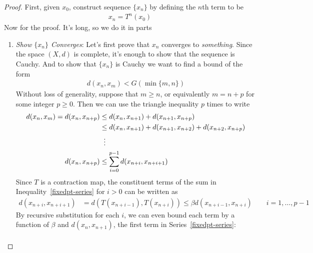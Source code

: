 \documentclass[12pt]{book}
\numberwithin{equation}{section} %
\theoremstyle{plain}
\theoremstyle{definition}
\theoremstyle{remark}
\begin{document}
\begin{proof}
First, given $x_0$, construct sequence $\{x_n\}$ by defining the $n$th
term to be
\begin{align}
  \label{contraction-map-seq}
  x_n = T^n(x_0)
\end{align}
Now for the proof. It's long, so we do it in parts
\begin{enumerate}
\item
\emph{Show $\{x_n\}$ Converges}:
Let's first prove that $x_n$ converges to \emph{something}. Since the
space $(X,d)$ is complete, it's enough to show that the sequence is
Cauchy.  And to show that $\{x_n\}$ is Cauchy we want to find a bound of
the form
\begin{align*}
  d(x_n,x_m) < G(\min\{m,n\})
\end{align*}
Without loss of generality, suppose that $m\geq n$, or equivalently
$m=n+p$ for some integer $p\geq 0$. Then we can use the triangle
inequality $p$ times to write
\begin{align}
  d(x_n,x_m) = d(x_n,x_{n+p})
  &\leq d(x_n,x_{n+1}) + d(x_{n+1},x_{n+p}) \notag \\
  &\leq d(x_n,x_{n+1}) + d(x_{n+1},x_{n+2}) + d(x_{n+2},x_{n+p})\notag\\
  &\;\; \vdots\notag\\
  d(x_n,x_{n+p})
  &\leq \sum^{p-1}_{i=0} d(x_{n+i},x_{n+i+1})
  \label{fixedpt-series}
\end{align}
Since $T$ is a contraction map, the constituent terms of the sum in
Inequality~\ref{fixedpt-series} for $i>0$ can be written as
\begin{align*}
  d(x_{n+i},x_{n+i+1}) &=
  d(T(x_{n+i-1}),T(x_{n+i}))
  \leq
  \beta d(x_{n+i-1},x_{n+i})
  \qquad i = 1,\ldots,p-1
\end{align*}
By recursive substitution for each $i$, we can even bound each term by a
function of $\beta$ and $d(x_n,x_{n+1})$, the first term in
Series~\ref{fixedpt-series}:
\begin{align*}

\end{align*}
\end{enumerate}
\end{proof}
\end{document}
